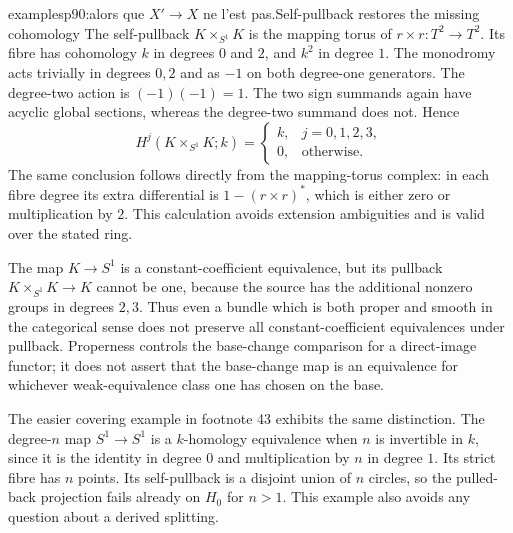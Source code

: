 \begin{dcomment}{examples}{p90:alors que $X' \to X$ ne l'est pas.}{Self-pullback restores the missing cohomology}
The self-pullback $K\times_{S^1}K$ is the mapping torus of
$r\times r:T^2\to T^2$. Its fibre has cohomology $k$ in degrees $0$ and $2$, and $k^2$ in degree $1$. The monodromy acts trivially in degrees $0,2$ and as $-1$ on both degree-one generators. The degree-two action is $(-1)(-1)=1$. The two sign summands again have acyclic global sections, whereas the degree-two summand does not. Hence
\[
 H^j(K\times_{S^1}K;k)=
 \begin{cases} k,&j=0,1,2,3,\\0,&\text{otherwise}.\end{cases}
\]
The same conclusion follows directly from the mapping-torus complex: in each fibre degree its extra differential is $1-(r\times r)^*$, which is either zero or multiplication by $2$. This calculation avoids extension ambiguities and is valid over the stated ring.

The map $K\to S^1$ is a constant-coefficient equivalence, but its pullback $K\times_{S^1}K\to K$ cannot be one, because the source has the additional nonzero groups in degrees $2,3$. Thus even a bundle which is both proper and smooth in the categorical sense does not preserve all constant-coefficient equivalences under pullback. Properness controls the base-change comparison for a direct-image functor; it does not assert that the base-change map is an equivalence for whichever weak-equivalence class one has chosen on the base.

The easier covering example in footnote 43 exhibits the same distinction. The degree-$n$ map $S^1\to S^1$ is a $k$-homology equivalence when $n$ is invertible in $k$, since it is the identity in degree $0$ and multiplication by $n$ in degree $1$. Its strict fibre has $n$ points. Its self-pullback is a disjoint union of $n$ circles, so the pulled-back projection fails already on $H_0$ for $n>1$. This example also avoids any question about a derived splitting.
\end{dcomment}

